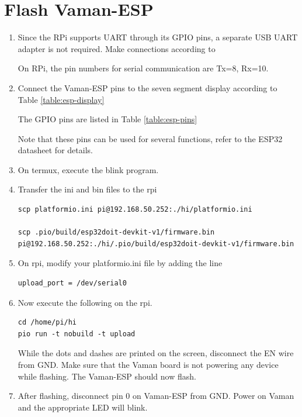 \section{Flash Vaman-ESP}
\renewcommand{\theequation}{\theenumi}
\renewcommand{\thefigure}{\theenumi}
\begin{enumerate}[label=\thesubsection.\arabic*.,ref=\thesubsection.\theenumi]
\item Since the RPi supports UART through its GPIO pins, a separate USB UART adapter is not required.  Make connections according to
			\begin{table}[!h]
		
		\caption{}
		\label{table:rpi-vaman-uart}
	\end{table}
	On RPi, the pin numbers for serial communication are Tx=8, Rx=10.
\item Connect the Vaman-ESP pins to the seven segment display  according to Table 
		\ref{table:esp-display}
	\begin{table}[!h]
		
		\caption{}
		\label{table:esp-display}
	\end{table}
	The GPIO pins are listed in Table 
		\ref{table:esp-pins}
	\begin{table}[!h]
		
		\caption{}
		\label{table:esp-pins}
	\end{table}
	Note that these pins can be used for several functions, refer to the ESP32 datasheet
		for details. 
	\item On termux, execute the blink program.
\item Transfer the ini and bin files to the rpi 
\begin{lstlisting}
scp platformio.ini pi@192.168.50.252:./hi/platformio.ini

scp .pio/build/esp32doit-devkit-v1/firmware.bin pi@192.168.50.252:./hi/.pio/build/esp32doit-devkit-v1/firmware.bin
\end{lstlisting}
\item On rpi,
modify your platformio.ini file by adding the line 
\begin{lstlisting}
upload_port = /dev/serial0
\end{lstlisting}
\item Now execute the following on the rpi.
\begin{lstlisting}
cd /home/pi/hi
pio run -t nobuild -t upload
\end{lstlisting}
While the dots and dashes are printed on the screen, disconnect the EN wire from GND.   Make sure that the Vaman board is not powering any device while flashing.  The Vaman-ESP should now flash.
\item After flashing, disconnect pin 0 on Vaman-ESP from GND. Power on Vaman and the appropriate LED will blink.
\end{enumerate}
\iffalse

